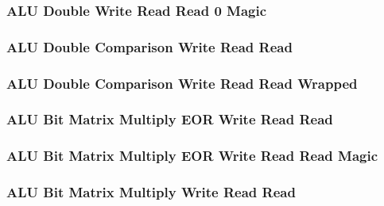 \subsubsection[{\small ALU Double Write Read Read 0 Magic}]{ALU Double Write Read Read 0 Magic} \label{sec:format-ALU-DWRR0.M}



\subsubsection[{\small ALU Double Comparison Write Read Read}]{ALU Double Comparison Write Read Read} \label{sec:format-ALU-DCWRR}



\subsubsection[{\small ALU Double Comparison Write Read Read Wrapped}]{ALU Double Comparison Write Read Read Wrapped} \label{sec:format-ALU-DCWRR.W}



\subsubsection[{\small ALU Bit Matrix Multiply EOR Write Read Read}]{ALU Bit Matrix Multiply EOR Write Read Read} \label{sec:format-ALU-DBMWRRR}



\subsubsection[{\small ALU Bit Matrix Multiply EOR Write Read Read Magic}]{ALU Bit Matrix Multiply EOR Write Read Read Magic} \label{sec:format-ALU-DBMWRRR.M}



\subsubsection[{\small ALU Bit Matrix Multiply Write Read Read}]{ALU Bit Matrix Multiply Write Read Read} \label{sec:format-ALU-DBMWRR}

